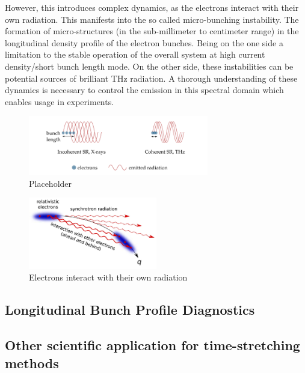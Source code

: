	However, this introduces complex dynamics, as the electrons interact with their own radiation.
	This manifests into the so called micro-bunching instability.
	The formation of micro-structures (in the sub-millimeter to centimeter range) in the longitudinal density profile of the electron bunches. %
	Being on the one side a limitation to the stable operation of the overall system at high current density/short bunch length mode.
	On the other side, these instabilities can be potential sources of brilliant THz radiation. %
	A thorough understanding of these dynamics is necessary to control the emission in this spectral domain which enables usage in experiments. \cite{rota2018,brosi}
	
	\begin{figure}[tbh]
		\centering
		\includegraphics[width = 0.7\textwidth]{chap/02-theory/img/csr2.png}
		\caption{Placeholder \cite{rota2018}}
		\label{fig:csr}
	\end{figure}
	
	\begin{figure}[tbh]
		\centering
		\includegraphics[width = 0.5\textwidth]{chap/02-theory/img/microbunching}
		\caption{Electrons interact with their own radiation \cite{Bielawski2019}}
		\label{fig:microBunch}
	\end{figure}
	\subsection{Longitudinal Bunch Profile Diagnostics}
	\subsection{Other scientific application for time-stretching methods}


